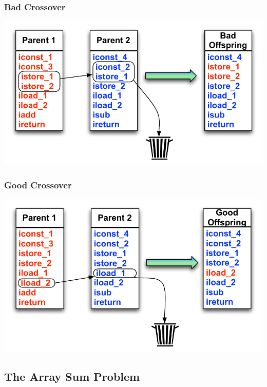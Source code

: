 \documentclass{beamer}
\begin{document}
\begin{frame}
  \frametitle{Bad Crossover}
  \begin{center}
  \includegraphics[height=.5\textheight]{Illustrations/badCrossover.pdf}
  \end{center}
  
\end{frame}


\begin{frame}

  \frametitle{Good Crossover}
  \begin{center}
  \includegraphics[height=.5\textheight]{Illustrations/goodCrossover.pdf}
  \end{center}
  
\end{frame}



\subsection[The Array Sum Problem]{The Array Sum Problem}
\end{document}
